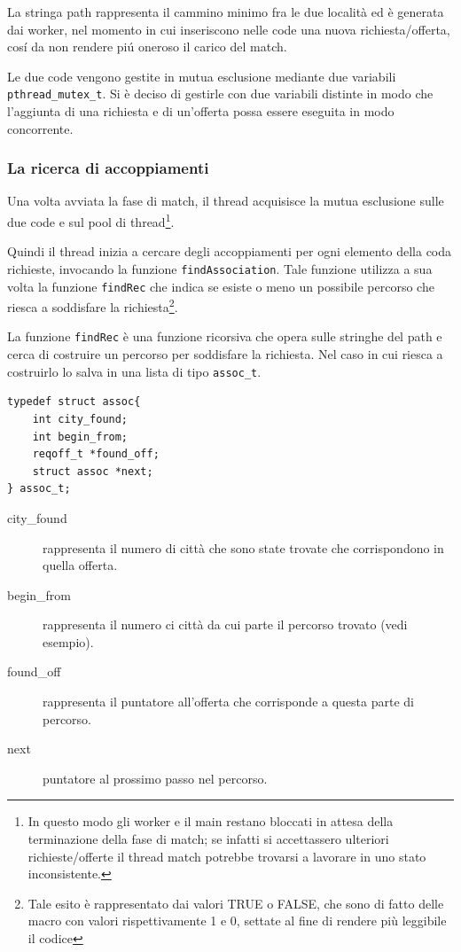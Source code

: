 \documentclass[a4paper,10pt]{article}
\begin{document}
La stringa path rappresenta il cammino minimo fra le due localit\`a ed \`e generata dai worker, nel momento in cui inseriscono nelle code una nuova richiesta/offerta, cos\'i da non rendere pi\'u oneroso il carico del match.

Le due code vengono gestite in mutua esclusione mediante due variabili \texttt{pthread\_mutex\_t}. Si \`e deciso di gestirle con due variabili distinte in modo che l'aggiunta di una richiesta e di un'offerta possa essere eseguita in modo concorrente.

\subsubsection{La ricerca di accoppiamenti}

Una volta avviata la fase di match, il thread acquisisce la mutua esclusione sulle due code e sul pool di thread\footnote{In questo modo gli worker e il main restano bloccati in attesa della terminazione della fase di match; se infatti si accettassero ulteriori richieste/offerte il thread match potrebbe trovarsi a lavorare in uno stato inconsistente.}.

Quindi il thread inizia a cercare degli accoppiamenti per ogni elemento della coda richieste, invocando la funzione \texttt{findAssociation}. Tale funzione utilizza a sua volta la funzione \texttt{findRec} che indica se esiste o meno un possibile percorso che riesca a soddisfare la richiesta\footnote{Tale esito \`e rappresentato dai valori TRUE o FALSE, che sono di fatto delle macro con valori rispettivamente 1 e 0, settate al fine di rendere pi\`u leggibile il codice}.

La funzione \texttt{findRec} \`e una funzione ricorsiva che opera sulle stringhe del path e cerca di costruire un percorso per soddisfare la richiesta. Nel caso in cui riesca a costruirlo lo salva in una lista di tipo \texttt{assoc\_t}.
\begin{verbatim}
typedef struct assoc{
    int city_found;
    int begin_from;
    reqoff_t *found_off;
    struct assoc *next;
} assoc_t;
\end{verbatim}

\begin{description}
	\item[city\_found] rappresenta il numero di citt\`a che sono state trovate che corrispondono in quella offerta.
	\item[begin\_from] rappresenta il numero ci citt\`a da cui parte il percorso trovato (vedi esempio).
	\item[found\_off] rappresenta il puntatore all'offerta che corrisponde a questa parte di percorso.
	\item[next] puntatore al prossimo passo nel percorso.
\end{description}
\end{document}
